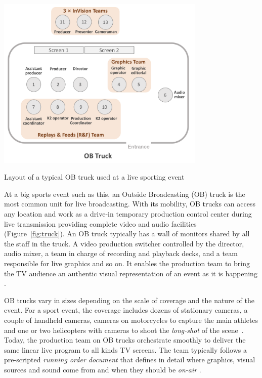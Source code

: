 \documentclass[sigchi-a, authorversion]{acmart}
\begin{document}
\begin{marginfigure}
\vspace{-10cm}
\hspace*{-2cm}
    \includegraphics[width=10cm]{Figures/OBtruck.png}
    \caption{Layout of a typical OB truck used at a live sporting event}
    \label{fig:truck}
\end{marginfigure}

At a big sports event such as this, an Outside Broadcasting (OB) truck is the most
common unit for live broadcasting. With its mobility, OB trucks can access any
location and work as a drive-in temporary production control center during live
transmission providing complete video and audio facilities (Figure~\ref{fig:truck}).
An OB truck typically has a wall of monitors shared by all the staff in the truck.
A video production switcher controlled by the director, audio mixer, a team in
charge of recording and playback decks, and a team responsible for live graphics
and so on. It enables the production team to bring the TV audience an authentic
visual representation of an event as it is happening \cite{owens2012, owens2015}.

OB trucks vary in sizes depending on the scale of coverage and the nature of the
event. For a sport event, the coverage includes dozens of stationary cameras, a
couple of handheld cameras, cameras on motorcycles to capture the main athletes
and one or two helicopters with cameras to shoot the \emph{long-shot} of the
scene~\cite{owens2012, Li:2018_TVX}. Today, the production team on OB trucks
orchestrate smoothly to deliver the same linear live program to all kinds TV
screens. The team typically follows a pre-scripted \emph{running order document} that
defines in detail where graphics, visual sources and sound come from and when
they should be \emph{on-air} \cite{Li:2018_TVX}.
\end{document}
